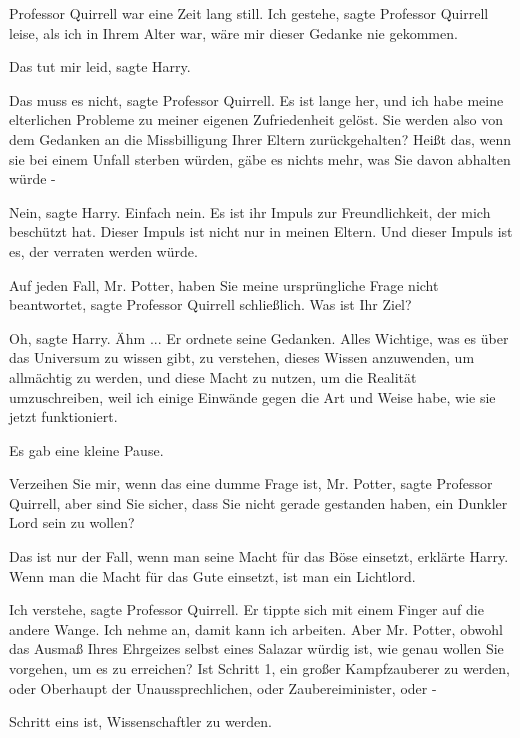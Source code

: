 Professor Quirrell war eine Zeit lang still. \glqq{}Ich gestehe\grqq{}, sagte
Professor Quirrell leise, \glqq{}als ich in Ihrem Alter war, wäre mir dieser
Gedanke nie gekommen.\grqq{}

\glqq{}Das tut mir leid\grqq{}, sagte Harry.

\glqq{}Das muss es nicht\grqq{}, sagte Professor Quirrell. \glqq{}Es ist lange
her, und ich habe meine elterlichen Probleme zu meiner eigenen Zufriedenheit
gelöst. Sie werden also von dem Gedanken an die Missbilligung Ihrer Eltern
zurückgehalten? Heißt das, wenn sie bei einem Unfall sterben würden, gäbe es
nichts mehr, was Sie davon abhalten würde -\grqq{}

\glqq{}Nein\grqq{}, sagte Harry. \glqq{}Einfach nein. Es ist ihr Impuls zur
Freundlichkeit, der mich beschützt hat. Dieser Impuls ist nicht nur in meinen
Eltern. Und dieser Impuls ist es, der verraten werden würde.\grqq{}

\glqq{}Auf jeden Fall, Mr. Potter, haben Sie meine ursprüngliche Frage nicht
beantwortet\grqq{}, sagte Professor Quirrell schließlich. \glqq{}Was ist Ihr
Ziel?\grqq{}

\glqq{}Oh\grqq{}, sagte Harry. \glqq{}Ähm ...\grqq{} Er ordnete seine Gedanken.
\glqq{}Alles Wichtige, was es über das Universum zu wissen gibt, zu verstehen,
dieses Wissen anzuwenden, um allmächtig zu werden, und diese Macht zu nutzen, um
die Realität umzuschreiben, weil ich einige Einwände gegen die Art und Weise
habe, wie sie jetzt funktioniert.\grqq{}

Es gab eine kleine Pause.

\glqq{}Verzeihen Sie mir, wenn das eine dumme Frage ist, Mr. Potter\grqq{}, sagte
Professor Quirrell, \glqq{}aber sind Sie sicher, dass Sie nicht gerade gestanden
haben, ein Dunkler Lord sein zu wollen?\grqq{}

\glqq{}Das ist nur der Fall, wenn man seine Macht für das Böse einsetzt\grqq{},
erklärte Harry. \glqq{}Wenn man die Macht für das Gute einsetzt, ist man ein
Lichtlord.\grqq{}

\glqq{}Ich verstehe\grqq{}, sagte Professor Quirrell. Er tippte sich mit einem
Finger auf die andere Wange. \glqq{}Ich nehme an, damit kann ich arbeiten. Aber
Mr. Potter, obwohl das Ausmaß Ihres Ehrgeizes selbst eines Salazar würdig ist,
wie genau wollen Sie vorgehen, um es zu erreichen? Ist Schritt 1, ein großer
Kampfzauberer zu werden, oder Oberhaupt der Unaussprechlichen, oder
Zaubereiminister, oder -\grqq{}

\glqq{}Schritt eins ist, Wissenschaftler zu werden.\grqq{}


